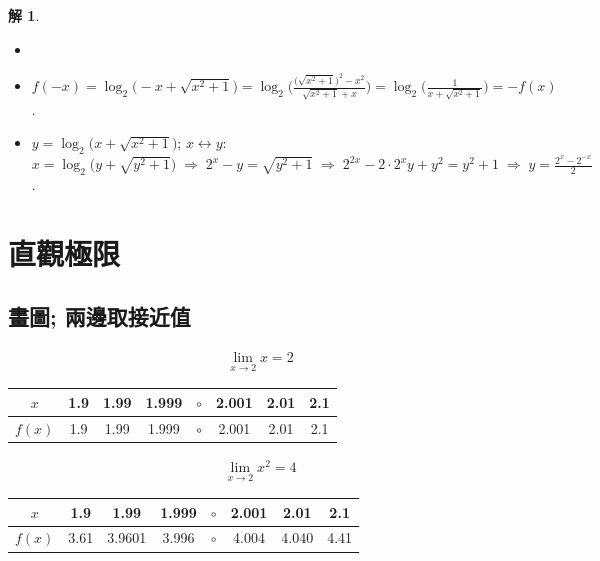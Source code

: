 \documentclass[12pt,a4paper]{extarticle}
\newcommand{\ds}{\displaystyle}
\newcommand{\ie}{\;\Longrightarrow\;}
\theoremstyle{definition}
\newtheorem*{sol}{解}
\begin{document}
\begin{sol}
  \vspace{-0.5em}
  \begin{itemize}\setlength\itemsep{0em}
    \item[]
    \item $\ds f(-x) = \log_2\big(-x + \sqrt{x^2 + 1}\big) = \log_2\bigg(\frac{\big(\sqrt{x^2 + 1}\big)^2 - x^2}{\sqrt{x^2 + 1} + x}\bigg) = \log_2\bigg(\frac{1}{x + \sqrt{x^2 + 1}}\bigg) = -f(x)$. 
    \item $\ds y = \log_2\big(x + \sqrt{x^2 + 1}\big)$; $x\longleftrightarrow y$: $\ds x = \log_2\big(y + \sqrt{y^2 + 1}\big)\ie 2^x - y = \sqrt{y^2 + 1} \ie 2^{2x} - 2\cdot2^x y + y^2 = y^2 + 1 \ie y = \frac{2^x - 2^{-x}}{2}$. 
  \end{itemize}
\end{sol}

\section*{直觀極限}

\subsection*{畫圖; 兩邊取接近值}

\begin{minipage}{0.23\textwidth}
\begin{align*}
  \lim_{x\to 2}x = 2
\end{align*}
\end{minipage}
\quad
\begin{minipage}{0.77\textwidth}
  \begin{tabular}{cccccccc}
    \toprule
    $x$ & 1.9 & 1.99 & 1.999 & $\circ$ & 2.001 & 2.01 & 2.1 \\
    \hline
    \addlinespace[2mm]
    $f(x)$ & 1.9 & 1.99 & 1.999 & $\circ$ & 2.001 & 2.01 & 2.1 \\
    \bottomrule
  \end{tabular}
\end{minipage}

\vspace{5mm}

\hspace{-7mm}
\begin{minipage}{0.23\textwidth}
\begin{align*}
  \lim_{x\to 2}x^2 = 4
\end{align*}
\end{minipage}
\quad
\begin{minipage}{0.77\textwidth}
  \begin{tabular}{cccccccc}
    \toprule
    $x$ & 1.9 & 1.99 & 1.999 & $\circ$ & 2.001 & 2.01 & 2.1 \\
    \hline
    \addlinespace[2mm]
    $f(x)$ & 3.61 & 3.9601 & 3.996 & $\circ$ & 4.004 & 4.040 & 4.41 \\
    \bottomrule
  \end{tabular}
\end{minipage}
\end{document}
